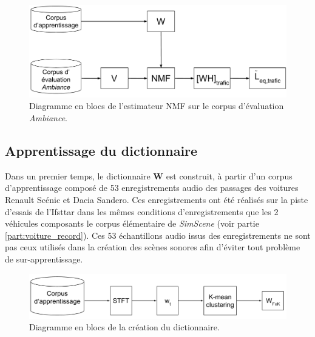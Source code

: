 \begin{figure}[ht]
\centering
\includegraphics[width=0.7\linewidth]{./figures/NMF/NMF_ambiance.pdf}
\caption{Diagramme en blocs de l'estimateur NMF sur le corpus d'évaluation \textit{Ambiance}.}
\label{fig:nmf_ambiance}
\end{figure}


\subsection{Apprentissage du dictionnaire}

Dans un premier temps, le dictionnaire $\mathbf{W}$ est construit, à partir d'un corpus d'apprentissage composé de 53  enregistrements audio des passages des voitures Renault Scénic et Dacia Sandero. Ces enregistrements ont été réalisés sur la piste d'essais de l'Ifsttar dans les mêmes conditions d'enregistrements que les 2 véhicules composants le corpus élémentaire de \textit{SimScene} (voir partie \ref{part:voiture_record}). Ces 53 échantillons audio issus des enregistrements ne sont pas ceux utilisés dans la création des scènes sonores afin d'éviter tout problème de sur-apprentissage.

\begin{figure}[hbtp]
\centering
\includegraphics[width=.9\linewidth]{./figures/NMF/creation_dictionaire.pdf}
\caption{Diagramme en blocs de la création du dictionnaire.}
\label{fig:creation_W}
\end{figure}


